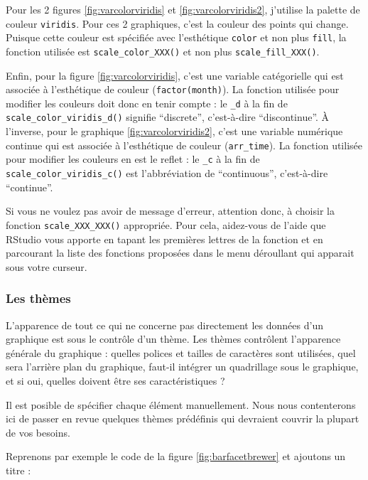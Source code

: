 \documentclass[a4paperpaper,]{article}
\theoremstyle{definition}
\theoremstyle{definition}
\theoremstyle{definition}
\theoremstyle{remark}
\begin{document}
Pour les 2 figures \ref{fig:varcolorviridis} et
\ref{fig:varcolorviridis2}, j'utilise la palette de couleur
\texttt{viridis}. Pour ces 2 graphiques, c'est la couleur des points qui
change. Puisque cette couleur est spécifiée avec l'esthétique
\texttt{color} et non plus \texttt{fill}, la fonction utilisée est
\texttt{scale\_color\_XXX()} et non plus \texttt{scale\_fill\_XXX()}.

Enfin, pour la figure \ref{fig:varcolorviridis}, c'est une variable
catégorielle qui est associée à l'esthétique de couleur
(\texttt{factor(month)}). La fonction utilisée pour modifier les
couleurs doit donc en tenir compte : le \texttt{\_d} à la fin de
\texttt{scale\_color\_viridis\_d()} signifie ``discrete'', c'est-à-dire
``discontinue''. À l'inverse, pour le graphique
\ref{fig:varcolorviridis2}, c'est une variable numérique continue qui
est associée à l'esthétique de couleur (\texttt{arr\_time}). La fonction
utilisée pour modifier les couleurs en est le reflet : le \texttt{\_c} à
la fin de \texttt{scale\_color\_viridis\_c()} est l'abbréviation de
``continuous'', c'est-à-dire ``continue''.

Si vous ne voulez pas avoir de message d'erreur, attention donc, à
choisir la fonction \texttt{scale\_XXX\_XXX()} appropriée. Pour cela,
aidez-vous de l'aide que RStudio vous apporte en tapant les premières
lettres de la fonction et en parcourant la liste des fonctions proposées
dans le menu déroullant qui apparait sous votre curseur.

\hypertarget{les-themes}{%
\subsubsection{Les thèmes}\label{les-themes}}

L'apparence de tout ce qui ne concerne pas directement les données d'un
graphique est sous le contrôle d'un thème. Les thèmes contrôlent
l'apparence générale du graphique : quelles polices et tailles de
caractères sont utilisées, quel sera l'arrière plan du graphique,
faut-il intégrer un quadrillage sous le graphique, et si oui, quelles
doivent être ses caractéristiques ?

Il est posible de spécifier chaque élément manuellement. Nous nous
contenterons ici de passer en revue quelques thèmes prédéfinis qui
devraient couvrir la plupart de vos besoins.

Reprenons par exemple le code de la figure \ref{fig:barfacetbrewer} et
ajoutons un titre :
\end{document}

